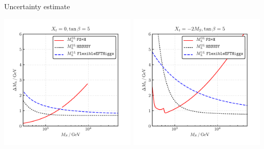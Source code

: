 \documentclass[hyperref={pdfpagelabels=false},ngerman]{beamer}
\begin{document}
\begin{frame}[noframenumbering]{Uncertainty estimate}
  \begin{center}
    \includegraphics[width=0.49\textwidth]{plots/kuts/DMh_MS_TB-5_Xt-0}\hfill
    \includegraphics[width=0.49\textwidth]{plots/kuts/DMh_MS_TB-5_Xt--2}
  \end{center}
\end{frame}
\end{document}
